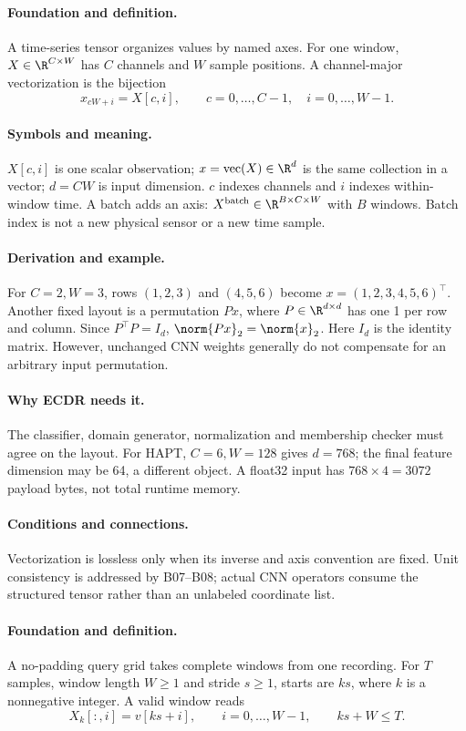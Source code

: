 \paragraph{Foundation and definition.}
A time-series tensor organizes values by named axes. For one window,
$X\in\R^{C\times W}$ has $C$ channels and $W$ sample positions. A
channel-major vectorization is the bijection
\[
 x_{cW+i}=X[c,i],\qquad
 c=0,\ldots,C-1,\quad i=0,\ldots,W-1.
\]
\paragraph{Symbols and meaning.}
$X[c,i]$ is one scalar observation; $x=\operatorname{vec}(X)\in\R^d$ is
the same collection in a vector; $d=CW$ is input dimension. $c$ indexes
channels and $i$ indexes within-window time. A batch adds an axis:
$X^{\mathrm{batch}}\in\R^{B\times C\times W}$ with $B$ windows. Batch
index is not a new physical sensor or a new time sample.
\paragraph{Derivation and example.}
For $C=2,W=3$, rows $(1,2,3)$ and $(4,5,6)$ become
$x=(1,2,3,4,5,6)^\top$. Another fixed layout is a permutation $Px$,
where $P\in\R^{d\times d}$ has one 1 per row and column. Since
$P^\top P=I_d$, $\norm{Px}_2=\norm{x}_2$. Here $I_d$ is the identity
matrix. However, unchanged CNN weights generally do not compensate for an
arbitrary input permutation.
\paragraph{Why ECDR needs it.}
The classifier, domain generator, normalization and membership checker must
agree on the layout. For HAPT, $C=6,W=128$ gives $d=768$; the final feature
dimension may be 64, a different object. A float32 input has
$768\times4=3072$ payload bytes, not total runtime memory.
\paragraph{Conditions and connections.}
Vectorization is lossless only when its inverse and axis convention are
fixed. Unit consistency is addressed by B07--B08; actual CNN operators
consume the structured tensor rather than an unlabeled coordinate list.

\paragraph{Foundation and definition.}
A no-padding query grid takes complete windows from one recording. For
$T$ samples, window length $W\ge1$ and stride $s\ge1$, starts are $ks$,
where $k$ is a nonnegative integer. A valid window reads
\[
 X_k[:,i]=v[ks+i],\qquad i=0,\ldots,W-1,
 \qquad ks+W\le T.
\]
